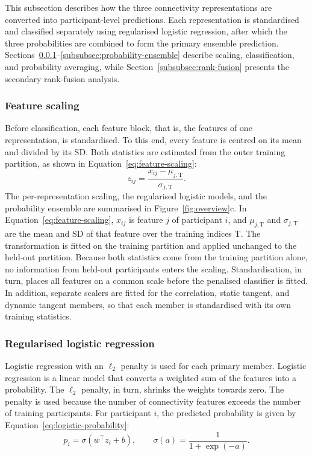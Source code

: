 This subsection describes how the three connectivity representations are converted into
participant-level predictions. Each representation is standardised and classified
separately using regularised logistic regression, after which the three probabilities are
combined to form the primary ensemble prediction. Sections~\ref{subsubsec:feature-scaling}--\ref{subsubsec:probability-ensemble}
describe scaling, classification, and probability averaging, while
Section~\ref{subsubsec:rank-fusion} presents the secondary rank-fusion analysis.

\subsubsection{Feature scaling}
\label{subsubsec:feature-scaling}

Before classification, each feature block, that is, the features of one representation, is
standardised. To this end, every feature is
centred on its mean and divided by its SD. Both statistics are estimated
from the outer training partition, as shown in Equation~\eqref{eq:feature-scaling}:
\begin{equation}
z_{ij}
=
\frac{x_{ij}-\mu_{j,\mathrm{T}}}
{\sigma_{j,\mathrm{T}}}.
\label{eq:feature-scaling}
\end{equation}
The per-representation scaling, the regularised logistic models, and the probability
ensemble are summarised in Figure~\ref{fig:overview}c. In Equation~\eqref{eq:feature-scaling}, $x_{ij}$ is feature $j$ of participant $i$, and
$\mu_{j,\mathrm{T}}$ and $\sigma_{j,\mathrm{T}}$ are the mean and SD of
that feature over the training indices $\mathrm{T}$. The transformation is fitted on the
training partition and applied unchanged to the held-out partition. Because both
statistics come from the training partition alone, no information from held-out
participants enters the scaling. Standardisation, in turn, places all features on a common
scale before the penalised classifier is fitted. In addition, separate scalers are fitted
for the correlation, static tangent, and dynamic tangent members, so that each member is
standardised with its own training statistics.

\subsubsection{Regularised logistic regression}
\label{subsubsec:logistic-regression}

Logistic regression with an $\ell_2$ penalty is used for each primary member. Logistic
regression is a linear model that converts a weighted sum of the features into a
probability. The $\ell_2$ penalty, in turn, shrinks the weights towards zero. The penalty
is used because the number of connectivity features exceeds the number of training
participants. For participant $i$, the predicted probability is given by
Equation~\eqref{eq:logistic-probability}:
\begin{equation}
p_i
=
\sigma(w^\top z_i+b),
\qquad
\sigma(a)
=
\frac{1}{1+\exp(-a)}.
\label{eq:logistic-probability}
\end{equation}

